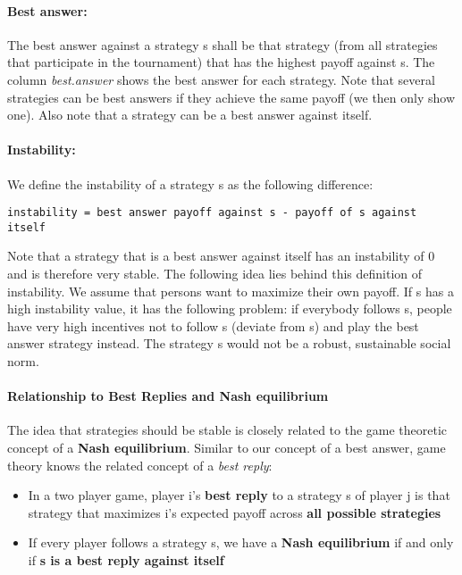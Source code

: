 \documentclass[]{article}
\begin{document}
\paragraph{\textbf{Best answer:}}

The best answer against a strategy s shall be that strategy (from all
strategies that participate in the tournament) that has the highest
payoff against s. The column \emph{best.answer} shows the best answer
for each strategy. Note that several strategies can be best answers if
they achieve the same payoff (we then only show one). Also note that a
strategy can be a best answer against itself.

\paragraph{\textbf{Instability:}}

We define the instability of a strategy s as the following difference:

\begin{verbatim}
instability = best answer payoff against s - payoff of s against itself
\end{verbatim}

Note that a strategy that is a best answer against itself has an
instability of 0 and is therefore very stable. The following idea lies
behind this definition of instability. We assume that persons want to
maximize their own payoff. If s has a high instability value, it has the
following problem: if everybody follows s, people have very high
incentives not to follow s (deviate from s) and play the best answer
strategy instead. The strategy s would not be a robust, sustainable
social norm.

\paragraph{Relationship to Best Replies and Nash equilibrium}

The idea that strategies should be stable is closely related to the game
theoretic concept of a \textbf{Nash equilibrium}. Similar to our concept
of a best answer, game theory knows the related concept of a \emph{best
reply}:

\begin{itemize}
\item
  In a two player game, player i's \textbf{best reply} to a strategy s
  of player j is that strategy that maximizes i's expected payoff across
  \textbf{all possible strategies}
\item
  If every player follows a strategy s, we have a \textbf{Nash
  equilibrium} if and only if \textbf{s is a best reply against itself}
\end{itemize}
\end{document}
